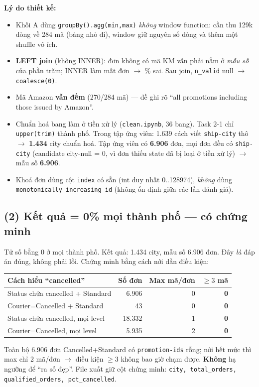 \textbf{Lý do thiết kế:}
\begin{itemize}
  \item Khối A dùng \texttt{groupBy().agg(min,max)} \emph{không} window function: cần thu 129k dòng về 284 mã (bảng nhỏ đi), window giữ nguyên số dòng và thêm một shuffle vô ích.
  \item \textbf{LEFT join} (không INNER): đơn không có mã KM vẫn phải nằm ở \emph{mẫu số} của phần trăm; INNER làm mất đơn $\to$ \% sai. Sau join, \texttt{n\_valid} null $\to$ \texttt{coalesce(0)}.
  \item Mã Amazon \textbf{vẫn đếm} (270/284 mã) — đề ghi rõ ``all promotions including those issued by Amazon''.
  \item Chuẩn hoá bang làm ở tiền xử lý (\texttt{clean.ipynb}, 36 bang). Task 2-1 chỉ \texttt{upper(trim)} thành phố. Trong tập ứng viên: 1.639 cách viết \texttt{ship-city} thô $\to$ \textbf{1.434} city chuẩn hoá. Tập ứng viên có \textbf{6.906} đơn, mọi đơn đều có \texttt{ship-city} (candidate city-null = 0, vì đơn thiếu state đã bị loại ở tiền xử lý) $\to$ mẫu số \textbf{6.906}.
  \item Khoá đơn dùng cột \texttt{index} có sẵn (int duy nhất 0..128974), \emph{không} dùng \texttt{monotonically\_increasing\_id} (không ổn định giữa các lần đánh giá).
\end{itemize}

\subsection*{(2) Kết quả = 0\% mọi thành phố — có chứng minh}
Tử số bằng 0 ở mọi thành phố. Kết quả: 1.434 city, mẫu số 6.906 đơn. Đây \emph{là} đáp án đúng, không phải lỗi. Chứng minh bằng cách nới dần điều kiện:
\begin{center}
\begin{tabular}{lrrr}
\hline
Cách hiểu ``cancelled'' & Số đơn & Max mã/đơn & $\ge 3$ mã \\
\hline
Status chứa cancelled + Standard & 6.906 & 0 & \textbf{0} \\
Courier=Cancelled + Standard & 43 & 0 & \textbf{0} \\
Status chứa cancelled, mọi level & 18.332 & 1 & \textbf{0} \\
Courier=Cancelled, mọi level & 5.935 & 2 & \textbf{0} \\
\hline
\end{tabular}
\end{center}
Toàn bộ 6.906 đơn Cancelled+Standard có \texttt{promotion-ids} rỗng; nới hết mức thì max chỉ 2 mã/đơn $\to$ điều kiện $\ge 3$ không bao giờ chạm được. \textbf{Không} hạ ngưỡng để ``ra số đẹp''. File xuất giữ cột chứng minh: \texttt{city, total\_orders, qualified\_orders, pct\_cancelled}.

